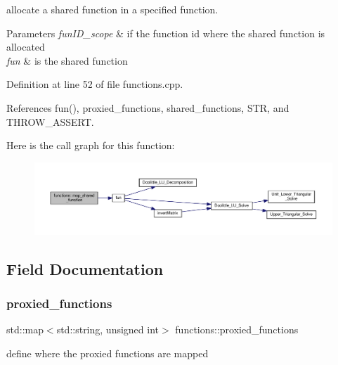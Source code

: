 allocate a shared function in a specified function. 


\begin{DoxyParams}{Parameters}
{\em fun\+I\+D\+\_\+scope} & if the function id where the shared function is allocated \\
\hline
{\em fun} & is the shared function \\
\hline
\end{DoxyParams}


Definition at line 52 of file functions.\+cpp.



References fun(), proxied\+\_\+functions, shared\+\_\+functions, S\+TR, and T\+H\+R\+O\+W\+\_\+\+A\+S\+S\+E\+RT.

Here is the call graph for this function\+:
\nopagebreak
\begin{figure}[H]
\begin{center}
\leavevmode
\includegraphics[width=350pt]{dd/d03/classfunctions_aa00c291ca69a502b86be3e3cfda701fc_cgraph}
\end{center}
\end{figure}


\subsection{Field Documentation}
\mbox{\label{classfunctions_a68eefa9220caa56e0264cef91a024edb}} 
\subsubsection{\texorpdfstring{proxied\+\_\+functions}{proxied\_functions}}
{\footnotesize\ttfamily std\+::map$<$std\+::string, unsigned int$>$ functions\+::proxied\+\_\+functions\hspace{0.3cm}{\ttfamily [private]}}



define where the proxied functions are mapped 



